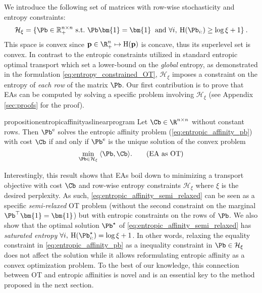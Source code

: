 We introduce the following set of matrices with row-wise stochasticity and entropy constraints:
\begin{align}
  \mathcal{H}_\xi = \{\Pb \in \mathbb{R}_+^{n \times n} \ \text{s.t.} \ \Pb \bm{1} = \bm{1} \: \ \text{and} \  \forall i, \: \operatorname{H}(\Pb_{i:}) \geq \log{\xi} + 1 \}\:.
\end{align}
This space is convex since $\mathbf{p} \in \R_+^n \mapsto \operatorname{H}(\mathbf{p})$ is concave, thus its superlevel set is convex. In contrast to the entropic constraints utilized in standard entropic optimal transport which set a lower-bound on the \emph{global} entropy, as demonstrated in the formulation \eqref{eq:entropy_constrained_OT}, $\mathcal{H}_\xi$ imposes a constraint on the entropy of \emph{each row} of the matrix $\Pb$.
Our first contribution is to prove that EAs can be computed by solving a specific problem involving $\mathcal{H}_\xi$ (see Appendix \ref{sec:proofs} for the proof).
\begin{restatable}{proposition}{entropicaffinityaslinearprogram}
\label{prop:entropic_affinity_as_linear_program}
Let $\Cb \in \R^{n \times n}$ without constant rows. Then $\Pb^{\mathrm{e}}$ solves the entropic affinity problem (\ref{eq:entropic_affinity_pb}) with cost $\Cb$ if and only if $\Pb^{\mathrm{e}}$ is the unique solution of the convex problem
\begin{equation}\label{eq:entropic_affinity_semi_relaxed}
    \min_{\Pb \in \mathcal{H}_{\xi}} \: \langle \Pb, \Cb \rangle .
    \tag{EA as OT}
\end{equation}
\end{restatable}
Interestingly, this result shows that EAs boil down to minimizing a transport objective with cost $\Cb$ and row-wise entropy constraints $\mathcal{H}_{\xi}$ where
$\xi$ is the desired perplexity. As such, \eqref{eq:entropic_affinity_semi_relaxed} can be seen as a specific \emph{semi-relaxed} OT problem \cite{rabin2014adaptive,flamary2016optimal} (\ie without the second constraint on the marginal $\Pb^\top \bm{1}= \bm{1}$) but with entropic constraints on the rows of $\Pb$. We also show that the optimal solution $\Pb^\star$ of \eqref{eq:entropic_affinity_semi_relaxed} has \emph{saturated entropy} \ie $\forall i, \: \operatorname{H}(\Pb^\star_{i:}) = \log{\xi} + 1$. In other words, relaxing the equality constraint in \eqref{eq:entropic_affinity_pb} as a inequality constraint in $\Pb \in \mathcal{H}_{\xi}$ does not affect the solution while it allows reformulating entropic affinity as a convex optimization problem. To the best of our knowledge, this connection between OT and entropic affinities is novel and is an essential key to the method proposed in the
next section.


